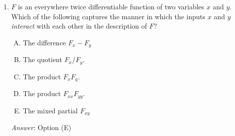 \documentclass[10pt]{amsart}
\begin{document}
\begin{enumerate}
  The other researcher believes that since the student has a limited
  budget, it would be more realistic to measure the increase in the
  examination score for a marginal increase in textbook expenditure
  {\em holding constant the total expenditure on both textbook and
  tuitions}. This is because the student is likely to allocate money
  away from tuition expenditures in order to spend money on textbooks.

  Which of the following best describes what's happening?

  \begin{enumerate}[(A)]
  \item Both researchers are effectively computing the same quantity.
  \item The two quantities that the researchers are computing have a
    simple linear relationship, i.e., their sum or difference is a
    constant.
  \item The two quantities that the researchers are computing are
    meaningfully different and there is a relationship between them
    but that relationship involves other partial derivatives.
  \end{enumerate}

  {\em Answer}: Option (C)

  {\em Explanation}: Too tricky to review here, but you might want to watch this video and subsequent ones in the playlist:

  \url{http://www.youtube.com/watch?v=tfH2iqt2E0E&list=PLC0bHnWu122kC1WBgr0H9PEbHTYnYev27&index=4}

  {\em Performance review}: $20$ out of $26$ got this correct. $3$
  each chose (A) and (B).
\item $F$ is an everywhere twice differentiable function of two
  variables $x$ and $y$. Which of the following captures the manner in
  which the inputs $x$ and $y$ {\em interact} with each other in the
  description of $F$?

  \begin{enumerate}[(A)]
  \item The difference $F_x - F_y$
  \item The quotient $F_x/F_y$.
  \item The product $F_xF_y$.
  \item The product $F_{xx}F_{yy}$.
  \item The mixed partial $F_{xy}$
  \end{enumerate}
 
  {\em Answer}: Option (E)


\end{enumerate}
\end{document}
